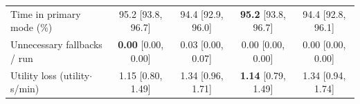 \begin{table}[t]
\begin{tabular}{lcccc}
\quad Time in primary mode (\%) & 95.2 {\scriptsize[93.8, 96.7]} & 94.4 {\scriptsize[92.9, 96.0]} & \textbf{95.2} {\scriptsize[93.8, 96.7]} & 94.4 {\scriptsize[92.8, 96.1]} \\
\quad Unnecessary fallbacks / run & \textbf{0.00} {\scriptsize[0.00, 0.00]} & 0.03 {\scriptsize[0.00, 0.07]} & 0.00 {\scriptsize[0.00, 0.00]} & 0.00 {\scriptsize[0.00, 0.00]} \\
\quad Utility loss (utility$\cdot$s/min) & 1.15 {\scriptsize[0.80, 1.49]} & 1.34 {\scriptsize[0.96, 1.71]} & \textbf{1.14} {\scriptsize[0.79, 1.49]} & 1.34 {\scriptsize[0.94, 1.74]} \\
\bottomrule
\end{tabular}
\end{table}
